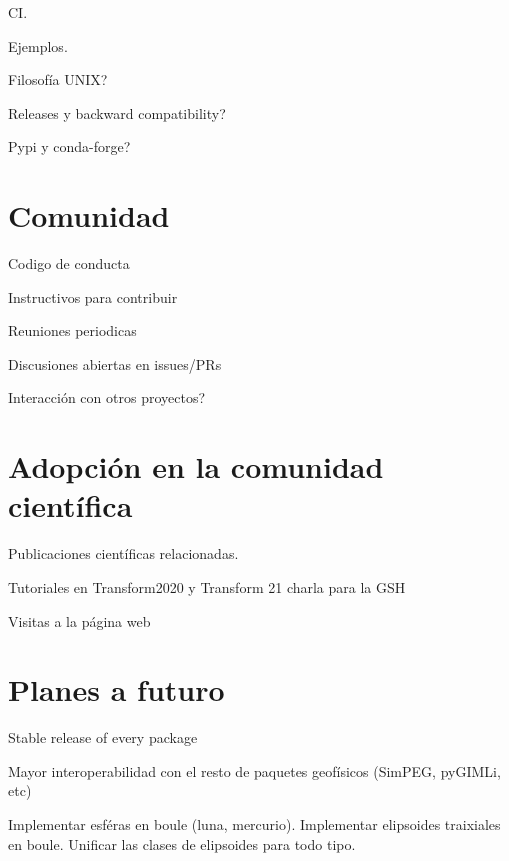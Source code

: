 CI.

Ejemplos.

Filosofía UNIX?

Releases y backward compatibility?

Pypi y conda-forge?


\section{Comunidad}

Codigo de conducta

Instructivos para contribuir

Reuniones periodicas

Discusiones abiertas en issues/PRs

Interacción con otros proyectos?


\section{Adopción en la comunidad científica}

Publicaciones científicas relacionadas.

Tutoriales en Transform2020 y Transform 21 charla para la GSH

Visitas a la página web


\section{Planes a futuro}

Stable release of every package

Mayor interoperabilidad con el resto de paquetes geofísicos (SimPEG, pyGIMLi, etc)

Implementar esféras en boule (luna, mercurio).
Implementar elipsoides traixiales en boule.
Unificar las clases de elipsoides para todo tipo.
